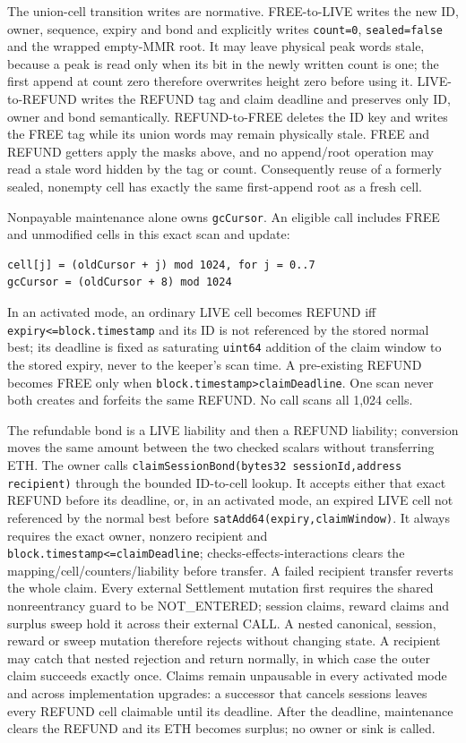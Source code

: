 \documentclass[a4paper,11pt]{article}
\newcommand{\code}[1]{\nolinkurl{#1}}
\begin{document}
The union-cell transition writes are normative.  FREE-to-LIVE writes the new
ID, owner, sequence, expiry and bond and explicitly writes \code{count=0},
\code{sealed=false} and the wrapped empty-MMR root.  It may leave physical peak
words stale, because a peak is read only when its bit in the newly written count
is one; the first append at count zero therefore overwrites height zero before
using it.  LIVE-to-REFUND writes the REFUND tag and claim deadline and preserves
only ID, owner and bond semantically.  REFUND-to-FREE deletes the ID key and
writes the FREE tag while its union words may remain physically stale.  FREE
and REFUND getters apply the masks above, and no append/root operation may read
a stale word hidden by the tag or count.  Consequently reuse of a formerly
sealed, nonempty cell has exactly the same first-append root as a fresh cell.

Nonpayable maintenance alone owns \code{gcCursor}.  An eligible call includes
FREE and unmodified cells in this exact scan and update:
\begin{verbatim}
cell[j] = (oldCursor + j) mod 1024, for j = 0..7
gcCursor = (oldCursor + 8) mod 1024
\end{verbatim}
In an activated mode,
an ordinary LIVE cell becomes REFUND iff
\code{expiry<=block.timestamp} and its ID is not referenced by the stored normal
best; its deadline is fixed as saturating \code{uint64} addition of the claim
window to the stored expiry, never to the keeper's scan time.  A pre-existing
REFUND becomes FREE only when
\code{block.timestamp>claimDeadline}.  One scan never both creates and forfeits
the same REFUND.  No call scans all 1,024 cells.

The refundable bond is a LIVE liability and then a REFUND liability; conversion
moves the same amount between the two checked scalars without transferring ETH.
The owner calls
\code{claimSessionBond(bytes32 sessionId,address recipient)} through the bounded
ID-to-cell lookup.  It accepts either that exact REFUND before its deadline, or,
in an activated mode, an expired LIVE cell not referenced by the normal best
before \code{satAdd64(expiry,claimWindow)}.  It always requires the exact owner,
nonzero recipient and \code{block.timestamp<=claimDeadline};
checks-effects-interactions clears
the mapping/cell/counters/liability before transfer.  A failed recipient transfer
reverts the whole claim.  Every external Settlement mutation first requires the
shared nonreentrancy guard to be NOT\_ENTERED; session claims, reward claims and
surplus sweep hold it across their external CALL.  A nested canonical, session,
reward or sweep mutation therefore rejects without changing state.  A recipient may catch that
nested rejection and return normally, in which case the outer claim succeeds
exactly once.  Claims remain unpausable in every activated mode and across
implementation upgrades: a successor that cancels sessions leaves every REFUND
cell claimable until its deadline.  After the deadline, maintenance
clears the REFUND and its ETH becomes surplus; no owner or sink is called.
\end{document}
